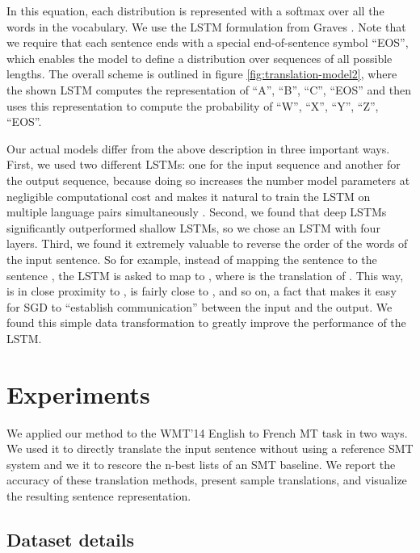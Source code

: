\documentclass{article} \usepackage{nips14submit_e}
\begin{document}
In this equation, each  distribution
is represented with a softmax over all the words in the
vocabulary.  We use the LSTM formulation from Graves \cite{graves13c}.
Note that we require that each sentence ends with a special
end-of-sentence symbol ``EOS'', which enables the model to define a
distribution over sequences of all possible lengths. The overall
scheme is outlined in figure \ref{fig:translation-model2}, where the
shown LSTM computes the representation of ``A'', ``B'', ``C'', ``EOS''
and then uses this representation to compute the probability of ``W'',
``X'', ``Y'', ``Z'', ``EOS''.

Our actual models differ from the above description in three important
ways.  First, we used two different LSTMs: one for the input sequence
and another for the output sequence, because doing so increases the
number model parameters at negligible computational cost and makes it
natural to train the LSTM on multiple language pairs simultaneously
\cite{kal13}.  Second, we found that deep LSTMs significantly
outperformed shallow LSTMs, so we chose an LSTM with four layers.
Third, we found it extremely valuable to reverse the order of the
words of the input sentence. So for example, instead of mapping the
sentence  to the sentence , the LSTM is
asked to map  to , where  is the translation of .  This way,  is in close
proximity to ,  is fairly close to , and so on, a
fact that makes it easy for SGD to ``establish communication'' between
the input and the output.  We found this simple data transformation to
greatly improve the performance of the LSTM.




 
\section{Experiments}
\label{sec:experiments}
 
We applied our method to the WMT'14 English to French MT task in two
ways.  We used it to directly translate the input sentence without
using a reference SMT system and we it to rescore the n-best lists of
an SMT baseline.  We report the accuracy of these translation methods,
present sample translations, and visualize the resulting sentence
representation.

\subsection{Dataset details}
\end{document}
